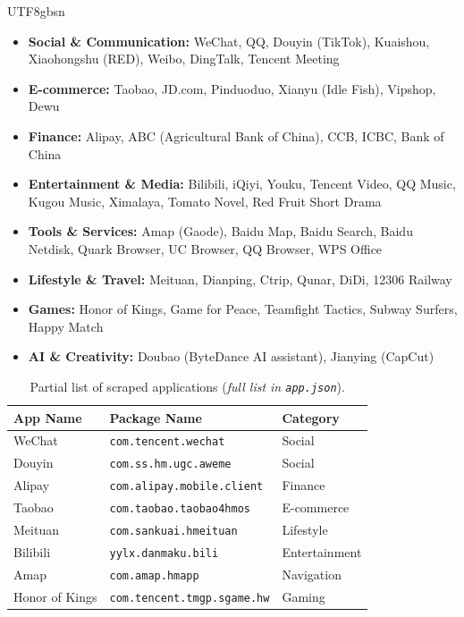 \documentclass[11pt,a4paper]{article}
\begin{document}
\begin{CJK*}{UTF8}{gbsn}
\begin{itemize}[nosep]
  \item \textbf{Social \& Communication:} WeChat, QQ, Douyin (TikTok), Kuaishou, Xiaohongshu (RED), Weibo, DingTalk, Tencent Meeting
  \item \textbf{E-commerce:} Taobao, JD.com, Pinduoduo, Xianyu (Idle Fish), Vipshop, Dewu
  \item \textbf{Finance:} Alipay, ABC (Agricultural Bank of China), CCB, ICBC, Bank of China
  \item \textbf{Entertainment \& Media:} Bilibili, iQiyi, Youku, Tencent Video, QQ Music, Kugou Music, Ximalaya, Tomato Novel, Red Fruit Short Drama
  \item \textbf{Tools \& Services:} Amap (Gaode), Baidu Map, Baidu Search, Baidu Netdisk, Quark Browser, UC Browser, QQ Browser, WPS Office
  \item \textbf{Lifestyle \& Travel:} Meituan, Dianping, Ctrip, Qunar, DiDi, 12306 Railway
  \item \textbf{Games:} Honor of Kings, Game for Peace, Teamfight Tactics, Subway Surfers, Happy Match
  \item \textbf{AI \& Creativity:} Doubao (ByteDance AI assistant), Jianying (CapCut)
\end{itemize}

\begin{table}[H]
\centering
\caption{Partial list of scraped applications (\textit{full list in \texttt{app.json}}).}
\label{tab:apps}
\small
\begin{tabular}{@{}lll@{}}
\toprule
\textbf{App Name} & \textbf{Package Name} & \textbf{Category} \\
\midrule
WeChat     & \texttt{com.tencent.wechat}         & Social \\
Douyin     & \texttt{com.ss.hm.ugc.aweme}        & Social \\
Alipay     & \texttt{com.alipay.mobile.client}   & Finance \\
Taobao     & \texttt{com.taobao.taobao4hmos}     & E-commerce \\
Meituan    & \texttt{com.sankuai.hmeituan}       & Lifestyle \\
Bilibili   & \texttt{yylx.danmaku.bili}          & Entertainment \\
Amap       & \texttt{com.amap.hmapp}             & Navigation \\
Honor of Kings & \texttt{com.tencent.tmgp.sgame.hw} & Gaming \\
\bottomrule
\end{tabular}
\end{table}


\end{CJK*}
\end{document}
